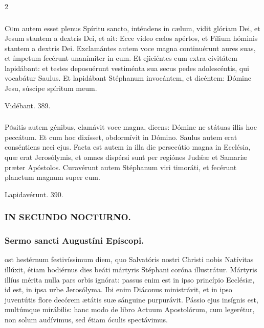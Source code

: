 \documentclass[9pt,twoside]{extarticle}
\begin{document}
\begin{multicols}{2}
\subsubsection*{\center {}}
\lettrine{C}um autem esset plenus Spíritu sancto, inténdens in cælum, vidit glóriam Dei, et Jesum stantem a dextris Dei, et ait: Ecce vídeo cælos apértos, et Fílium hóminis stantem a dextris Dei.
Exclamántes autem voce magna continuérunt aures suas, et ímpetum fecérunt unanímiter in eum.
Et ejiciéntes eum extra civitátem lapidábant: et testes deposuérunt vestiménta sua secus pedes adolescéntis, qui vocabátur Saulus.
Et lapidábant Stéphanum invocántem, et dicéntem: Dómine Jesu, súscipe spíritum meum.

\begin{tightlist}{}
\item {} Vidébant. 389.
\end{tightlist}

\subsubsection*{\center {}}
\lettrine{P}ósitis autem génibus, clamávit voce magna, dicens: Dómine ne státuas illis hoc peccátum. Et cum hoc dixísset, obdormívit in Dómino. Saulus autem erat conséntiens neci ejus.
Facta est autem in illa die persecútio magna in Ecclésia, quæ erat Jerosólymis, et omnes dispérsi sunt per regiónes Judǽæ et Samaríæ præter Apóstolos.
Curavérunt autem Stéphanum viri timoráti, et fecérunt planctum magnum super eum.

\begin{tightlist}{}
\item {} Lapidavérunt. 390.
\end{tightlist}

\subsubsection*{\center \textsc{IN SECUNDO NOCTURNO.}}
\subsubsection*{\center Sermo sancti Augustíni Epíscopi.}
\begin{center}\end{center}
ost hestérnum festivíssimum diem, quo Salvatóris nostri Christi nobis Natívitas illúxit, étiam hodiérnus dies beáti mártyris Stéphani coróna illustrátur. Mártyris illíus mérita nulla pars orbis ignórat: passus enim est in ipso princípio Ecclésiæ, id est, in ipsa urbe Jerosólyma. Ibi enim Diáconus ministrávit, et in ipso juventútis flore decórem ætátis suæ sánguine purpurávit. Pássio ejus insígnis est, multúmque mirábilis: hanc modo de libro Actuum Apostolórum, cum legerétur, non solum audívimus, sed étiam óculis spectávimus.


\end{multicols}
\end{document}
